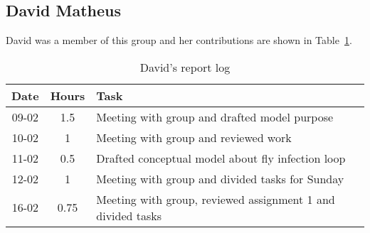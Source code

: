 \subsection{David Matheus}
David was a member of this group and her contributions are shown in Table~\ref{tab:david_log}. 
\begin{longtable}[c]{c|c|m{35em}}
\caption{David's report log}
\label{tab:david_log}\\
\textbf{Date}& \textbf{Hours} & \textbf{Task} \\
\hline
\endfirsthead
%
\endhead
%
09-02      &   1.5    &  Meeting with group and drafted model purpose                                 \\
10-02      &    1   &    Meeting with group and reviewed work                                \\
11-02      &    0.5   &    Drafted conceptual model about fly infection loop                                \\
12-02      &    1   &    Meeting with group and divided tasks for Sunday    \\
16-02      &  0.75      &   Meeting with group, reviewed assignment 1 and divided tasks
\end{longtable}